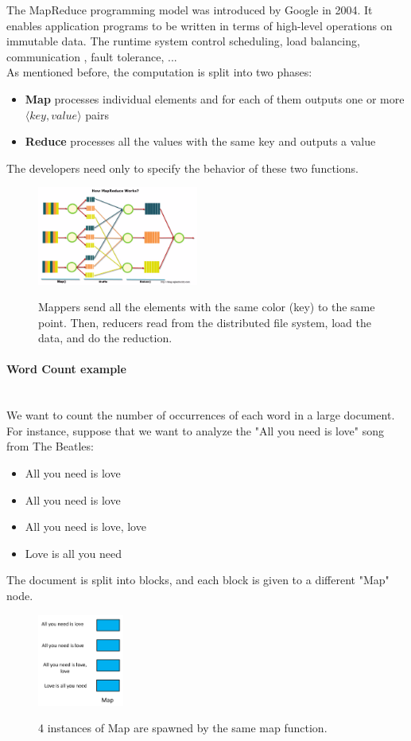 \documentclass[10pt,a4paper]{article}
\newcommand{\myparagraph}[1]{\paragraph{#1}\mbox{}\\[0.05in]}
\begin{document}
The MapReduce programming model was introduced by Google in 2004. It enables application programs to be written in terms of high-level operations on immutable data. The runtime system control scheduling, load balancing, communication , fault tolerance, ... \\
As mentioned before, the computation is split into two phases: 
\begin{itemize}
	\item \textbf{Map} processes individual elements and for each of them outputs one or more $\langle key,value \rangle$ pairs
	\item \textbf{Reduce} processes all the values with the same key and outputs a value
\end{itemize}
The developers need only to specify the behavior of these two functions.
\begin{figure}[h!]
\hfill \includegraphics[width=150pt]{images/map-reduce-how.png}\hspace*{\fill}
  \label{fig:map-reduce-how}
  \caption{Mappers send all the elements with the same color (key) to the same point. Then, reducers read from the distributed file system, load the data, and do the reduction.}
\end{figure} 
\myparagraph{Word Count example}
We want to count the number of occurrences of each word in a large document. For instance, suppose that we want to analyze the "All you need is love" song from The Beatles:
\begin{itemize}
	\item All you need is love
	\item All you need is love
	\item All you need is love, love
	\item Love is all you need
\end{itemize}
The document is split into blocks, and each block is given to a different "Map" node.
\begin{figure}[h!]
\hfill \includegraphics[width=80pt]{images/map-example.png}\hspace*{\fill}
  \label{fig:map-example}
  \caption{4 instances of Map are spawned by the same map function.}
\end{figure} 
\end{document}
